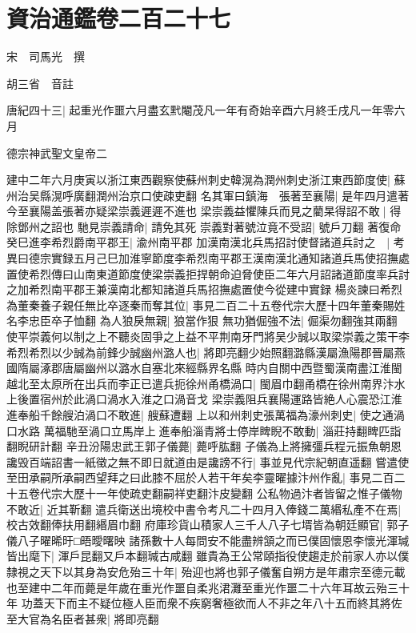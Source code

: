 \chapter{資治通鑑卷二百二十七}
宋　司馬光　撰

胡三省　音註

唐紀四十三|{
	起重光作噩六月盡玄黓閹茂凡一年有奇始辛酉六月終壬戌凡一年零六月}


德宗神武聖文皇帝二

建中二年六月庚寅以浙江東西觀察使蘇州刺史韓滉為潤州刺史浙江東西節度使|{
	蘇州治吴縣滉呼廣翻潤州治京口使疎吏翻}
名其軍曰鎮海　張著至襄陽|{
	是年四月遣著今至襄陽盖張著亦疑梁崇義遲遲不進也}
梁崇義益懼陳兵而見之藺杲得詔不敢|{
	得除鄧州之詔也}
馳見崇義請命|{
	請免其死}
崇義對著號泣竟不受詔|{
	號戶刀翻}
著復命癸巳進李希烈爵南平郡王|{
	渝州南平郡}
加漢南漢北兵馬招討使督諸道兵討之　|{
	考異曰德宗實録五月己巳加淮寧節度李希烈南平郡王漢南漢北通知諸道兵馬使招撫處置使希烈傳曰山南東道節度使梁崇義拒捍朝命迫脅使臣二年六月詔諸道節度率兵討之加希烈南平郡王兼漢南北都知諸道兵馬招撫處置使今從建中實録}
楊炎諫曰希烈為董秦養子親任無比卒逐秦而奪其位|{
	事見二百二十五卷代宗大歷十四年董秦賜姓名李忠臣卒子恤翻}
為人狼戾無親|{
	狼當作狠}
無功猶倔強不法|{
	倔渠勿翻強其兩翻}
使平崇義何以制之上不聽炎固爭之上益不平荆南牙門將吴少誠以取梁崇義之策干李希烈希烈以少誠為前鋒少誠幽州潞人也|{
	將即亮翻少始照翻潞縣漢屬漁陽郡晉屬燕國隋屬涿郡唐屬幽州以潞水自塞北來經縣界名縣}
時内自關中西暨蜀漢南盡江淮閩越北至太原所在出兵而李正已遣兵扼徐州甬橋渦口|{
	閩眉巾翻甬橋在徐州南界汴水上後置宿州於此渦口渦水入淮之口渦音戈}
梁崇義阻兵襄陽運路皆絶人心震恐江淮進奉船千餘艘泊渦口不敢進|{
	艘蘇遭翻}
上以和州刺史張萬福為濠州刺史|{
	使之通渦口水路}
萬福馳至渦口立馬岸上進奉船淄青將士停岸睥睨不敢動|{
	淄莊持翻睥匹詣翻睨研計翻}
辛丑汾陽忠武王郭子儀薨|{
	薨呼肱翻}
子儀為上將擁彊兵程元振魚朝恩讒毁百端詔書一紙徵之無不即日就道由是讒謗不行|{
	事並見代宗紀朝直遥翻}
嘗遣使至田承嗣所承嗣西望拜之曰此膝不屈於人若干年矣李靈曜據汴州作亂|{
	事見二百二十五卷代宗大歷十一年使疏吏翻嗣祥吏翻汴皮變翻}
公私物過汴者皆留之惟子儀物不敢近|{
	近其靳翻}
遣兵衛送出境校中書令考凡二十四月入俸錢二萬緡私產不在焉|{
	校古效翻俸扶用翻緡眉巾翻}
府庫珍貨山積家人三千人八子七壻皆為朝廷顯官|{
	郭子儀八子曜晞旴□晤曖曙映}
諸孫數十人每問安不能盡辨頷之而已僕固懷恩李懷光渾瑊皆出麾下|{
	渾戶昆翻又戶本翻瑊古咸翻}
雖貴為王公常頤指役使趨走於前家人亦以僕隸視之天下以其身為安危殆三十年|{
	殆迎也將也郭子儀奮自朔方是年肅宗至德元載也至建中二年而薨是年歲在重光作噩自柔兆涒灘至重光作噩二十六年耳故云殆三十年}
功蓋天下而主不疑位極人臣而衆不疾窮奢極欲而人不非之年八十五而終其將佐至大官為名臣者甚衆|{
	將即亮翻}
